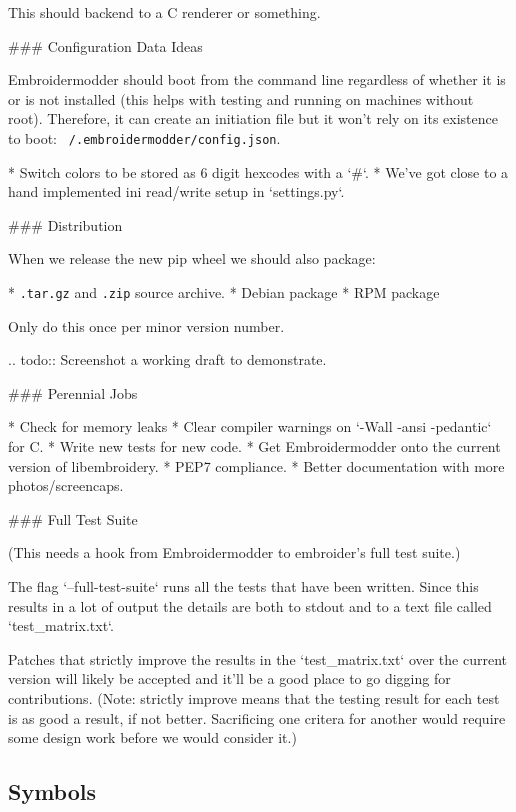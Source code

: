 This should backend to a C renderer or something.

### Configuration Data Ideas

Embroidermodder should boot from the command line regardless of whether it is or is not
installed (this helps with testing and running on machines without root). Therefore, it can
create an initiation file but it won't rely on its existence to boot:
\texttt{~/.embroidermodder/config.json}.

* Switch colors to be stored as 6 digit hexcodes with a `\#`.
* We've got close to a hand implemented ini read/write setup in `settings.py`.

### Distribution


When we release the new pip wheel we should also package:

* \texttt{.tar.gz} and \texttt{.zip} source archive.
* Debian package
* RPM package

Only do this once per minor version number.

.. todo::
   Screenshot a working draft to demonstrate.

### Perennial Jobs

* Check for memory leaks
* Clear compiler warnings on `-Wall -ansi -pedantic` for C.
* Write new tests for new code.
* Get Embroidermodder onto the current version of libembroidery.
* PEP7 compliance.
* Better documentation with more photos/screencaps.

### Full Test Suite


(This needs a hook from Embroidermodder to embroider's full test suite.)

The flag `--full-test-suite` runs all the tests that have been written.
Since this results in a lot of output the details are both to stdout
and to a text file called `test\_matrix.txt`.

Patches that strictly improve the results in the `test\_matrix.txt` over
the current version will likely be accepted and it'll be a good place
to go digging for contributions. (Note: strictly improve means that
the testing result for each test is as good a result, if not better.
Sacrificing one critera for another would require some design work
before we would consider it.)

\subsection{Symbols}

